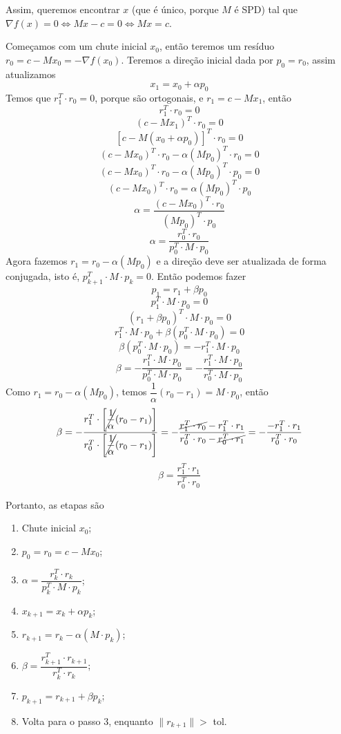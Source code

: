 \documentclass{article}
\begin{document}
    \newpage

    Assim, queremos encontrar $x$ (que é único, porque $M$ é SPD) tal que $\nabla f(x) = 0 \iff Mx-c = 0 \iff Mx = c$.

    Começamos com um chute inicial $x_0$, então teremos um resíduo $r_0 = c - Mx_0 = -\nabla f(x_0)$. Teremos a direção inicial dada por $p_0 = r_0$, assim atualizamos
    \[x_1 = x_0 + \alpha p_0\]
    Temos que $r_1^T \cdot r_0 = 0$, porque são ortogonais, e $r_1 = c-Mx_1$, então
    \[r_1^T \cdot r_0 = 0\]
    \[(c-Mx_1)^T \cdot r_0 = 0\]
    \[[c-M(x_0 + \alpha p_0)]^T \cdot r_0 = 0\]
    \[(c-Mx_0)^T \cdot r_0 - \alpha(Mp_0)^T \cdot r_0 = 0\]
    \[(c-Mx_0)^T \cdot r_0 - \alpha(Mp_0)^T \cdot p_0 = 0\]
    \[(c-Mx_0)^T \cdot r_0 = \alpha(Mp_0)^T \cdot p_0\]
    \[\alpha = \frac{(c-Mx_0)^T \cdot r_0}{(Mp_0)^T \cdot p_0}\]
    \[\alpha = \frac{r_0^T \cdot r_0}{p_0^T \cdot M \cdot p_0}\]
    Agora fazemos $r_1 = r_0 - \alpha(Mp_0)$ e a direção deve ser atualizada de forma conjugada, isto é, $p_{k+1}^T \cdot M \cdot p_k = 0$. Então podemos fazer
    \[p_1 = r_1 + \beta p_0\]
    \[p_{1}^T \cdot M \cdot p_0 = 0\]
    \[(r_1 + \beta p_0)^T \cdot M \cdot p_0 = 0\]
    \[r_1^T \cdot M \cdot p_0 + \beta (p_0^T \cdot M \cdot p_0) = 0\]
    \[\beta (p_0^T \cdot M \cdot p_0) = -r_1^T \cdot M \cdot p_0\]
    \[\beta = -\frac{r_1^T \cdot M \cdot p_0}{p_0^T \cdot M \cdot p_0} = -\frac{r_1^T \cdot M \cdot p_0}{r_0^T \cdot M \cdot p_0}\]
    Como $r_1 = r_0 - \alpha(Mp_0)$, temos $\dfrac{1}{\alpha}(r_0 - r_1) = M \cdot p_0$, então
    \[\beta = -\frac{r_1^T \cdot \left[\cancel{\dfrac{1}{\alpha}}(r_0 - r_1)\right]}{r_0^T \cdot \left[\cancel{\dfrac{1}{\alpha}}(r_0 - r_1)\right]} = - \frac{\cancel{r_1^T \cdot r_0} - r_1^T \cdot r_1}{r_0^T \cdot r_0 - \cancel{r_0^T \cdot r_1}} = - \frac{- r_1^T \cdot r_1}{r_0^T \cdot r_0}\]
    \[\beta = \frac{r_1^T \cdot r_1}{r_0^T \cdot r_0}\]

    \newpage

    Portanto, as etapas são
    {\hspace{2cm}
    \begin{enumerate}[leftmargin=2cm]
        \item Chute inicial $x_0$;
        \item $p_0 = r_0 = c - Mx_0$;
        \item $\alpha = \dfrac{r_k^T \cdot r_k}{p_k^T \cdot M \cdot p_k}$;
        \item $x_{k+1} = x_k + \alpha p_k$;
        \item $r_{k+1} = r_k - \alpha (M \cdot p_k)$;
        \item $\beta = \dfrac{r_{k+1}^T \cdot r_{k+1}}{r_k^T \cdot r_k}$;
        \item $p_{k+1} = r_{k+1} + \beta p_k$;
        \item Volta para o passo 3, enquanto $\|r_{k+1}\| > $ tol.
    \end{enumerate}
    }
    
\end{document}
